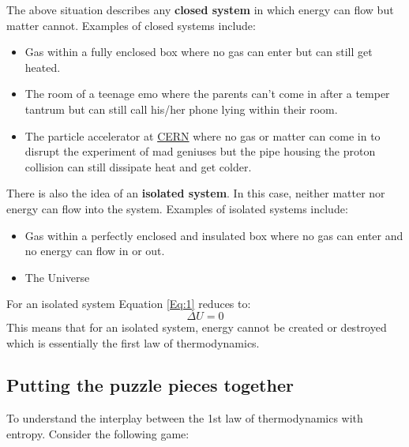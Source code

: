 \vspace{0,3cm}
The above situation describes any \textbf{closed system} in which energy can flow but matter cannot. Examples of closed systems include: 
\begin{itemize}
    \item Gas within a fully enclosed box where no gas can enter but can still get heated.
    \item The room of a teenage emo where the parents can't come in after a temper tantrum but can still call his/her phone lying within their room.
    \item The particle accelerator at \href{https://www.home.cern/}{CERN} where no gas or matter can come in to disrupt the experiment of mad geniuses but the pipe housing the proton collision can still dissipate heat and get colder. 
\end{itemize}
There is also the idea of an \textbf{isolated system}. In this case, neither matter nor energy can flow into the system. Examples of isolated systems include: 
\begin{itemize}
    \item Gas within a perfectly enclosed and insulated box where no gas can enter and no energy can flow in or out. 
    \item The Universe
\end{itemize}
For an isolated system Equation \ref{Eq:1} reduces to: 
\begin{equation}
    \Delta U=0 
    \label{Eq:2}
\end{equation}
 This means that for an isolated system, energy cannot be created or destroyed which is essentially the first law of thermodynamics. 
\subsection{Putting the puzzle pieces together}
To understand the interplay between the 1st law of thermodynamics with entropy. Consider the following game: \par

